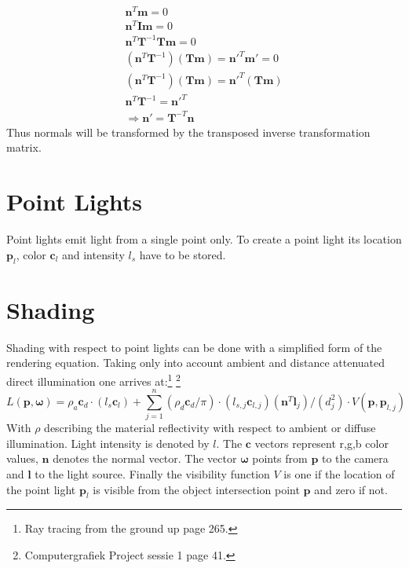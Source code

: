 \begin{align}
\mathbf{n}^T\mathbf{m} = 0 \\
\mathbf{n}^T\mathbf{I}\mathbf{m} = 0 \\
\mathbf{n}^T\mathbf{T}^{-1}\mathbf{T}\mathbf{m} = 0 \\
(\mathbf{n}^T\mathbf{T}^{-1})(\mathbf{T}\mathbf{m}) = \mathbf{n'}^T\mathbf{m'} =  0 \\
(\mathbf{n}^T\mathbf{T}^{-1})(\mathbf{T}\mathbf{m}) = \mathbf{n'}^T(\mathbf{Tm}) \\
\mathbf{n}^T\mathbf{T}^{-1} = \mathbf{n'}^T \\
\Rightarrow \mathbf{n'} = \mathbf{T}^{-T}\mathbf{n}
\end{align}
Thus normals will be transformed by the transposed inverse transformation matrix.

\section{Point Lights}
Point lights emit light from a single point only. To create a point light its location $\mathbf{p}_l$, color $\mathbf{c}_l$ and intensity $l_s$ have to be stored. 


\section{Shading}
Shading with respect to point lights can be done with a simplified form of the rendering equation. Taking only into account ambient and distance attenuated direct illumination one arrives at:\footnote{Ray tracing from the ground up page 265. } \footnote{Computergrafiek Project sessie 1 page 41. }
\begin{equation}
L(\mathbf{p},\mathbf{\omega}) = \rho_a \mathbf{c}_d \cdot (l_s \mathbf{c}_l) + \sum_{j=1}^{n}(\rho_d \mathbf{c}_d/ \pi)
\cdot (l_{s,j}\mathbf{c}_{l,j})(\mathbf{n}^T\mathbf{l}_j)/(d_j^2) \cdot V(\mathbf{p},\mathbf{p}_{l,j})
\end{equation} 
With $\rho$ describing the material reflectivity with respect to ambient or diffuse illumination. Light intensity is denoted by $l$. The $\mathbf{c}$ vectors represent r,g,b color values, $\mathbf{n}$ denotes the normal vector. The vector $\mathbf{\omega}$ points from $\mathbf{p}$ to the camera and $\mathbf{l}$ to the light source. Finally the visibility function $V$ is one if the location of the point light $\mathbf{p}_l$ is visible from the object intersection point $\mathbf{p}$ and zero if not.


